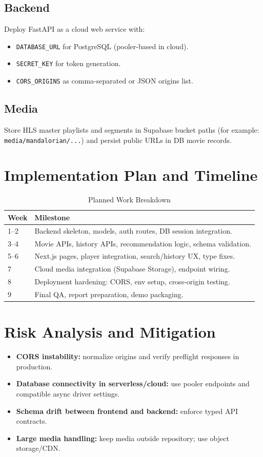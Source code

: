 \documentclass[conference]{IEEEtran}
\begin{document}
\subsection{Backend}
Deploy FastAPI as a cloud web service with:
\begin{itemize}
\item \texttt{DATABASE\_URL} for PostgreSQL (pooler-based in cloud).
\item \texttt{SECRET\_KEY} for token generation.
\item \texttt{CORS\_ORIGINS} as comma-separated or JSON origins list.
\end{itemize}

\subsection{Media}
Store HLS master playlists and segments in Supabase bucket paths (for example: \texttt{media/mandalorian/...}) and persist public URLs in DB movie records.

\section{Implementation Plan and Timeline}
\begin{table}[h]
\caption{Planned Work Breakdown}
\label{tab:timeline}
\centering
\begin{tabular}{p{1.2cm} p{5.7cm}}
\toprule
\textbf{Week} & \textbf{Milestone} \\
\midrule
1--2 & Backend skeleton, models, auth routes, DB session integration. \\
3--4 & Movie APIs, history APIs, recommendation logic, schema validation. \\
5--6 & Next.js pages, player integration, search/history UX, type fixes. \\
7 & Cloud media integration (Supabase Storage), endpoint wiring. \\
8 & Deployment hardening: CORS, env setup, cross-origin testing. \\
9 & Final QA, report preparation, demo packaging. \\
\bottomrule
\end{tabular}
\end{table}

\section{Risk Analysis and Mitigation}
\begin{itemize}
\item \textbf{CORS instability:} normalize origins and verify preflight responses in production.
\item \textbf{Database connectivity in serverless/cloud:} use pooler endpoints and compatible async driver settings.
\item \textbf{Schema drift between frontend and backend:} enforce typed API contracts.
\item \textbf{Large media handling:} keep media outside repository; use object storage/CDN.
\end{itemize}
\end{document}
